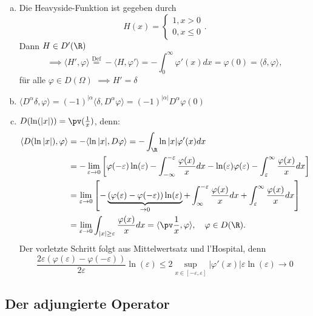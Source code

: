 \begin{enumerate}[a)]
  \item Die Heavyside-Funktion ist gegeben durch
    $$
    H(x) = \begin{cases} 1, x > 0 \\ 0, x \leq 0 \end{cases}.
    $$
    Dann $H \in D'(\R)$
    $$
    \implies \langle H', \varphi\rangle \overset{\text{Def}}{=} -\langle H, \varphi'\rangle = -\int_0^\infty \varphi'(x) dx = \varphi(0) = \langle \delta, \varphi \rangle,
    $$
    für alle $\varphi \in D(\Omega)$ $ \implies H' = \delta $

  \item $\langle D^\alpha \delta, \varphi \rangle = (-1)^{|\alpha} \langle \delta, D^\alpha \varphi \rangle = (-1)^{|\alpha|} D^\alpha \varphi(0)$

  \item $D(\ln(|x|)) = \pv(\frac{1}{x})$, denn:
    \begin{align*}
      \langle D(\ln|x|), \varphi \rangle 
      &= -\langle \ln|x|, D\varphi \rangle = -\int_\R \ln|x| \varphi'(x) dx \\
      &= -\lim_{\varepsilon \to 0} \left[ \varphi(-\varepsilon) \ln(\varepsilon) - \int_{-\infty}^{-\varepsilon} \frac{\varphi(x)}{x} dx - \ln(\varepsilon) \varphi(\varepsilon) - \int_\varepsilon^\infty \frac{\varphi(x)}{x} dx \right] \\
      &= \lim_{\varepsilon \to 0} \left[ -\underbrace{(\varphi(\varepsilon) - \varphi(-\varepsilon))\ln(\varepsilon)}_{\to 0} + \int_{\infty}^{-\varepsilon} \frac{\varphi(x)}{x} dx + \int_\varepsilon^\infty \frac{\varphi(x)}{x} dx \right]\\
      &= \lim_{\varepsilon \to 0} \int_{|x| \geq \varepsilon} \frac{\varphi(x)}{x} dx 
      = \langle \pv \frac{1}{x}, \varphi \rangle, \quad \varphi \in D(\R).
    \end{align*}
    \tiny{
    Der vorletzte Schritt folgt aus Mittelwertsatz und l'Hospital, denn
    $$
    \frac{2\varepsilon (\varphi(\varepsilon)- \varphi(-\varepsilon))}{2\varepsilon}\ln(\varepsilon)
    \leq 2 \sup_{x \in [-\varepsilon, \varepsilon]} |\varphi'(x)| \varepsilon \ln(\varepsilon)
    \to 0
    $$
    }  
\end{enumerate}

\subsection{Der adjungierte Operator}

